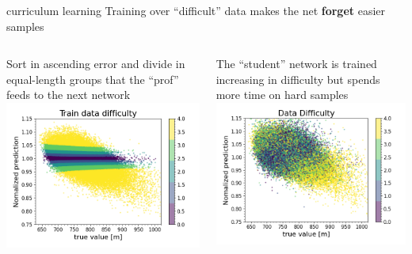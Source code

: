 \documentclass{beamer}
\begin{document}
\begin{frame}{curriculum learning}
    Training over ``difficult'' data makes the net \textbf{forget} easier samples
    \vfill
    \begin{columns}
        \begin{column}{.5\textwidth}
            Sort in ascending error and divide in equal-length groups that the ``prof'' feeds to the next network
            \includegraphics[width=\textwidth]{figures/curriculum_before.png}
        \end{column}
        \begin{column}{.5\textwidth}
            The ``student'' network is trained increasing in difficulty but spends more time on 
            hard samples
            \includegraphics[width=\textwidth]{figures/curriculum_after.png}
        \end{column}
    \end{columns}
\end{frame}
\end{document}
